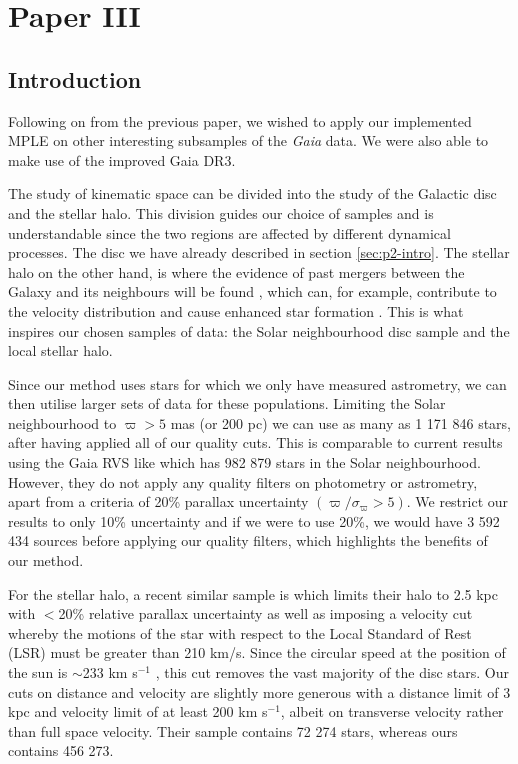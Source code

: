 \chapter{Paper III}\label{chap:paper3}
\section{Introduction}\label{sec:p3-intro}
Following on from the previous paper, we wished to apply our implemented MPLE on other interesting subsamples of the \textit{Gaia} data. We were also able to make use of the improved Gaia DR3. 

The study of kinematic space can be divided into the study of the Galactic disc and the stellar halo. This division guides our choice of samples and is understandable since the two regions are affected by different dynamical processes. The disc we have already described in section \ref{sec:p2-intro}. The stellar halo on the other hand, is where the evidence of past mergers between the Galaxy and its neighbours will be found \citep{helmi:20}, which can, for example, contribute to the velocity distribution and cause enhanced star formation \citep{ruiz-lara:20}. This is what inspires our chosen samples of data: the Solar neighbourhood disc sample and the local stellar halo.

Since our method uses stars for which we only have measured astrometry, we can then utilise larger sets of data for these populations. Limiting the Solar neighbourhood to $\varpi > 5$ mas (or 200 pc) we can use as many as 1 171 846 stars, after having applied all of our quality cuts. This is comparable to current results using the Gaia RVS like \cite{lucchini:22} which has 982 879 stars in the Solar neighbourhood. However, they do not apply any quality filters on photometry or astrometry, apart from a criteria of 20\% parallax uncertainty $(\varpi / \sigma_\varpi > 5)$. We restrict our results to only 10\% uncertainty and if we were to use 20\%, we would have 3 592 434 sources before applying our quality filters, which highlights the benefits of our method.

For the stellar halo, a recent similar sample is \cite{dodd:22} which limits their halo to 2.5 kpc with $<$20\% relative parallax uncertainty as well as imposing a velocity cut whereby the motions of the star with respect to the Local Standard of Rest (LSR) must be greater than 210 km/s. Since the circular speed at the position of the sun is ${\sim}$233 km s$^{-1}$ \citep{mcmillan:17}, this cut removes the vast majority of the disc stars. Our cuts on distance and velocity are slightly more generous with a distance limit of 3 kpc and velocity limit of at least 200 km s$^{-1}$, albeit on transverse velocity rather than full space velocity. Their sample contains 72 274 stars, whereas ours contains 456 273. 

